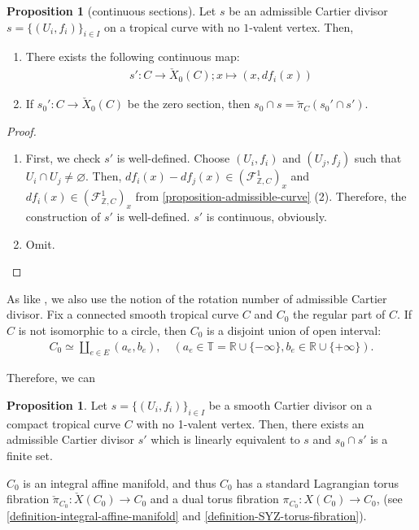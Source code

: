 \documentclass[a4paper,dvipdfmx,reqno,12pt]{amsart}
\theoremstyle{definition}
\newtheorem{proposition}[theorem]{Proposition}
\newcommand{\emp}{\varnothing}%
\numberwithin{equation}{section}
\begin{document}
\begin{proposition}[{continuous sections}]
\label{proposition-admissible-section}
Let $s$ be an admissible Cartier divisor 
$s=\{(U_i,f_i)\}_{i\in I}$ on a tropical curve with 
no $1$-valent vertex. 
Then, 
\begin{enumerate}
\item There exists the following continuous map:
\begin{align}
s'\colon C\to \check{X}_0 (C); x\mapsto (x,df_{i}(x))
\end{align}
\item If $s_0'\colon C\to \check{X}_0 (C)$ be the 
zero section, then $s_0\cap s=\check{\pi}_C(s_0'\cap s')$.
\end{enumerate}
\end{proposition}
\begin{proof}
\begin{enumerate}
\item First, we check $s'$ is well-defined.
Choose $(U_i,f_i)$ and $(U_j,f_j)$ such that
$U_i\cap U_j\neq \emp$. 
Then, $df_i(x)-df_j(x)\in 
(\mathcal{F}_{\mathbb{Z},C}^{1})_x$ and
$df_i(x)\in (\mathcal{F}_{\mathbb{Z},C}^{1})_x$
from \cref{proposition-admissible-curve} (2).
Therefore, the construction of $s'$ is well-defined.
$s'$ is continuous, obviously.
\item Omit.
\end{enumerate}
\end{proof}


As like \cite{auroux2022lagrangian},
we also use the notion of the rotation number of 
admissible Cartier divisor.
Fix a connected smooth tropical curve $C$
 and $C_0$ the 
regular part of $C$.
If $C$ is not isomorphic to a circle, then
$C_0$ is a disjoint union of open interval:
\begin{align}
  C_0\simeq \coprod_{e\in E} (a_e,b_e), \quad
(a_e\in \mathbb{T}
=\mathbb{R}\cup\{-\infty\}, b_e\in \mathbb{R}\cup\{+\infty\}).
\end{align}

Therefore, we can

\begin{proposition}
Let $s=\{(U_i,f_i)\}_{i\in I}$ be a smooth Cartier divisor on a compact
tropical curve $C$ with no 1-valent vertex.
Then, there exists
an admissible Cartier divisor $s'$ which is linearly
equivalent to $s$ and
$s_0\cap s'$ is a finite set. 
\end{proposition}




$C_0$ is an integral affine manifold, 
and thus $C_0$ has a standard Lagrangian torus fibration
$\check{\pi}_{C_0}\colon \check{X}(C_0)\to C_0$ and
a dual torus fibration 
$\pi_{C_0}\colon X(C_0)\to C_0$,
(see \cref{definition-integral-affine-manifold}
and \cref{definition-SYZ-torus-fibration}).
\end{document}
